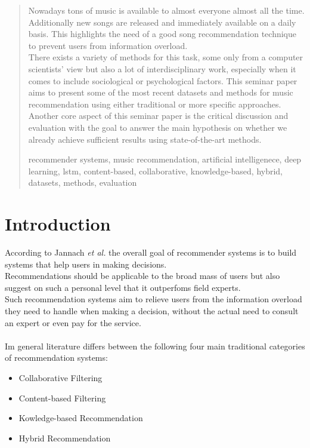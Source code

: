 \documentclass[runningheads,a4paper]{llncs}
\newcommand{\keywords}[1]{\par\addvspace\baselineskip
\noindent\keywordname\enspace\ignorespaces#1}
\begin{document}
\maketitle
\begin{abstract}
  Nowadays tons of music is available to almost everyone almost all the time. Additionally new songs are released and immediately available on a daily basis. 
  This highlights the need of a good song recommendation technique to prevent users from information overload. \\
  There exists a variety of methods for this task, some only from a computer scientists’ view but also a lot of interdisciplinary work, especially when it comes to include sociological or psychological factors. 
  This seminar paper aims to present some of the most recent datasets and methods for music recommendation using either traditional or more specific approaches. 
  Another core aspect of this seminar paper is the critical discussion and evaluation with the goal to answer the main hypothesis on whether we already achieve sufficient results using state-of-the-art methods. 
  

\keywords{recommender systems, music recommendation, artificial intelligenece, deep learning, lstm, content-based, collaborative, knowledge-based, hybrid, datasets, methods, evaluation}
\end{abstract}

\section{Introduction}
According to Jannach \textit{et al.} \cite{jannach2010recommender}
 the overall goal of recommender systems is to build systems that help users in making decisions.\\
Recommendations should be applicable to the broad mass of users but also suggest on such a personal level that it outperfoms field experts. 
\\
Such recommendation systems aim to relieve users from the information overload they need to handle when 
making a decision, without the actual need to consult an expert or even pay for the service.\\ 
\\
Im general literature differs between the following four main traditional categories of recommendation systems: 
\begin{itemize}
  \item Collaborative Filtering
  \item Content-based Filtering
  \item Kowledge-based Recommendation
  \item Hybrid Recommendation
\end{itemize}
\end{document}
